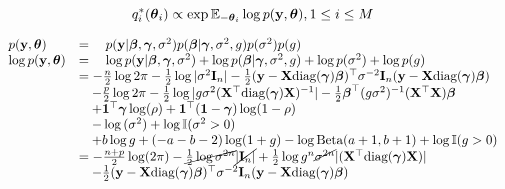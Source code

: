\documentclass{amsart}[12pt]
\theoremstyle{definition}
\begin{document}
\begin{equation*}
	q_i^*({\boldsymbol \theta}_i) \propto \exp{ {\mathbb E}_{-{\boldsymbol\theta}_i} \log{p({\bf y}, {\boldsymbol\theta})} }, 1 \leq i \leq M
\end{equation*}

\begin{equation*}
	\begin{array}{ll}
		p({\bf y}, {\boldsymbol \theta})       & = \quad p({\bf y} | {\boldsymbol \beta}, {\boldsymbol \gamma}, \sigma^2) p({\boldsymbol \beta} | {\boldsymbol \gamma}, \sigma^2, g) p(\sigma^2) p(g)                                                                                    \\
		\log{p({\bf y}, {\boldsymbol\theta})} & = \quad \log{p({\bf y}| {\boldsymbol\beta}, {\boldsymbol\gamma}, \sigma^2)} + \log{p({\boldsymbol\beta}| {\boldsymbol\gamma}, \sigma^2, g)} + \log{p(\sigma^2)} + \log{p(g)}                                                      \\
		                      & = -\frac{n}{2} \log{2 \pi} -\tfrac{1}{2} \log |\sigma^2 {\bf I}_n| - \tfrac{1}{2} ({\bf y} - {\bf X} \text{diag}({\boldsymbol \gamma}) {\boldsymbol \beta})^\top \sigma^{-2} {\bf I}_n ({\bf y} - {\bf X} \text{diag}({\boldsymbol \gamma}) {\boldsymbol \beta})          \\
		                      & \quad -\frac{p}{2} \log{2 \pi} - \tfrac{1}{2} \log |g \sigma^2 ({\bf X}^\top \text{diag}({\boldsymbol \gamma}) {\bf X})^{-1}| -                                                                             
		\tfrac{1}{2} {\boldsymbol \beta}^\top (g \sigma^2)^{-1} ({\bf X}^\top {\bf X}) {\boldsymbol \beta} \\
		                      & \quad + {\bf 1}^\top {\boldsymbol\gamma} \log(\rho) + {\bf 1}^\top ({\bf 1} - {\boldsymbol \gamma}) \log(1 - \rho)                                                                                             \\
		                      & \quad - \log{(\sigma^2)} + \log {\mathbb I} (\sigma^2 > 0)                                                                                                                              \\
		                      & \quad + b \log g + (-a - b - 2) \log(1 + g) - \log \text{Beta}(a + 1,  b + 1) + \log {\mathbb I}(g > 0)                                                                                 \\
		                      & = -\frac{n + p}{2} \log(2 \pi) - \cancel{\tfrac{1}{2} \log{\sigma^{2n}}} \cancel{|{\bf I}_n|}                                                                                              
		+\tfrac{1}{2} \log{g^n \cancel{\sigma^{2n}}} |({\bf X}^\top \text{diag}({\boldsymbol \gamma}) {\bf X})| \\
		                      & \quad		-\tfrac{1}{2} ({\bf y} - {\bf X} \text{diag}({\boldsymbol \gamma}) {\boldsymbol \beta})^\top \sigma^{-2} {\bf I}_n ({\bf y} - {\bf X} \text{diag}({\boldsymbol \gamma}) {\boldsymbol \beta})                                                            \\

\end{array}
\end{equation*}
\end{document}

